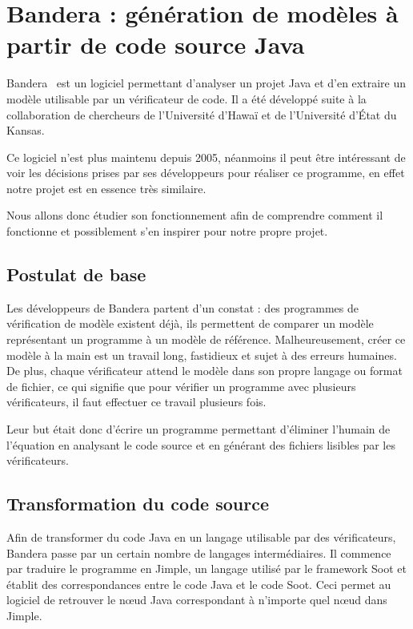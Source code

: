\chapter{Bandera : génération de modèles à partir de code source Java}

Bandera~\cite{bandera1} est un logiciel permettant d'analyser un projet Java et d'en
extraire un modèle utilisable par un vérificateur de code. Il a été
développé suite à la collaboration de chercheurs de l'Université
d'Hawaï et de l'Université d'État du Kansas.

Ce logiciel n'est plus maintenu depuis 2005, néanmoins il peut être
intéressant de voir les décisions prises par ses développeurs pour
réaliser ce programme, en effet notre projet est en essence très similaire.

Nous allons donc étudier son fonctionnement afin de comprendre comment
il fonctionne et possiblement s'en inspirer pour notre propre projet.

\section{Postulat de base}

Les développeurs de Bandera partent d'un constat : des programmes de
vérification de modèle existent déjà, ils permettent de comparer un
modèle représentant un programme à un modèle de
référence. Malheureusement, créer ce modèle à la main est un travail
long, fastidieux et sujet à des erreurs humaines. De plus, chaque
vérificateur attend le modèle dans son propre langage ou format de
fichier, ce qui signifie que pour vérifier un programme avec plusieurs
vérificateurs, il faut effectuer ce travail plusieurs fois.

Leur but était donc d'écrire un programme permettant d'éliminer
l'humain de l'équation en analysant le code source et en générant des
fichiers lisibles par les vérificateurs. 

\section{Transformation du code source}

Afin de transformer du code Java en un langage utilisable par des
vérificateurs, Bandera passe par un certain nombre de langages
intermédiaires. Il commence par traduire le programme en Jimple, un
langage utilisé par le framework Soot et établit des correspondances
entre le code Java et le code Soot. Ceci permet au logiciel de
retrouver le n\oe{}ud Java correspondant à n'importe quel n\oe{}ud
dans Jimple.

